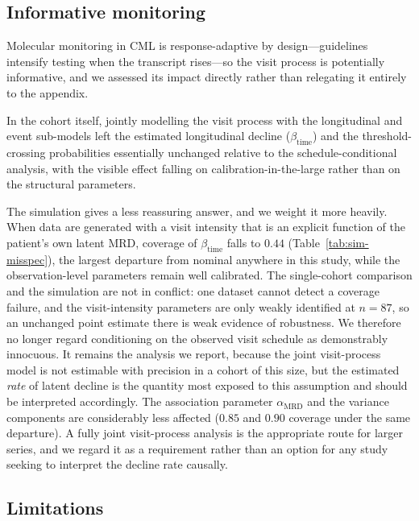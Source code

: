 \documentclass[11pt]{article}
\begin{document}
\subsection{Informative monitoring}

Molecular monitoring in CML is response-adaptive by design---guidelines
intensify testing when the transcript rises---so the visit process is
potentially informative, and we assessed its impact directly rather than
relegating it entirely to the appendix.

In the cohort itself, jointly modelling the visit process with the longitudinal
and event sub-models left the estimated longitudinal decline
($\beta_{\mathrm{time}}$) and the threshold-crossing probabilities essentially
unchanged relative to the schedule-conditional analysis, with the visible effect
falling on calibration-in-the-large rather than on the structural parameters.

The simulation gives a less reassuring answer, and we weight it more heavily.
When data are generated with a visit intensity that is an explicit function of
the patient's own latent MRD, coverage of $\beta_{\mathrm{time}}$ falls to
$0.44$ (Table~\ref{tab:sim-misspec}), the largest departure from nominal
anywhere in this study, while the observation-level parameters remain well
calibrated. The single-cohort comparison and the simulation are not in conflict:
one dataset cannot detect a coverage failure, and the visit-intensity parameters
are only weakly identified at $n=87$, so an unchanged point estimate there is
weak evidence of robustness. We therefore no longer regard conditioning on the
observed visit schedule as demonstrably innocuous. It remains the analysis we
report, because the joint visit-process model is not estimable with precision in
a cohort of this size, but the estimated \emph{rate} of latent decline is the
quantity most exposed to this assumption and should be interpreted accordingly.
The association parameter $\alpha_{\mathrm{MRD}}$ and the variance components
are considerably less affected ($0.85$ and $0.90$ coverage under the same
departure). A fully joint visit-process analysis is the appropriate route for
larger series, and we regard it as a requirement rather than an option for any
study seeking to interpret the decline rate causally.

\subsection{Limitations}
\label{sec:limits}
\end{document}
